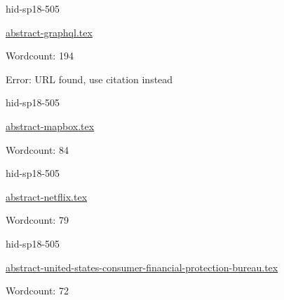 

\begin{IU}

hid-sp18-505

\href{https://github.com/cloudmesh-community/hid-sp18-505/blob/master//technology/abstract-graphql.tex}{abstract-graphql.tex}

 

Wordcount: 194

Error: URL found, use citation instead
\end{IU}



\begin{IU}

hid-sp18-505

\href{https://github.com/cloudmesh-community/hid-sp18-505/blob/master//technology/abstract-mapbox.tex}{abstract-mapbox.tex}

 

Wordcount: 84

\end{IU}



\begin{IU}

hid-sp18-505

\href{https://github.com/cloudmesh-community/hid-sp18-505/blob/master//technology/abstract-netflix.tex}{abstract-netflix.tex}

 

Wordcount: 79

\end{IU}



\begin{IU}

hid-sp18-505

\href{https://github.com/cloudmesh-community/hid-sp18-505/blob/master//technology/abstract-united-states-consumer-financial-protection-bureau.tex}{abstract-united-states-consumer-financial-protection-bureau.tex}

 

Wordcount: 72

\end{IU}



